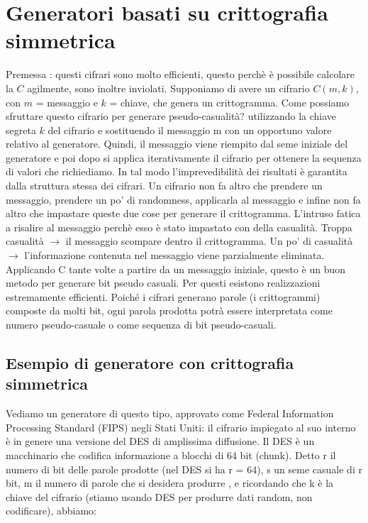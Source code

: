 \newpage

\section{Generatori basati su crittografia simmetrica}

Premessa : questi cifrari sono molto efficienti, questo perchè è possibile calcolare la $C$ agilmente, sono inoltre inviolati. Supponiamo di avere un cifrario $C(m, k)$, con $m$ = messaggio e $k$ = chiave, che genera un crittogramma. Come possiamo sfruttare questo cifrario per generare pseudo-casualità? utilizzando la chiave segreta $k$ del cifrario e sostituendo il messaggio m con un opportuno valore relativo al generatore. Quindi, il messaggio viene riempito dal seme iniziale del generatore e poi dopo si applica iterativamente il cifrario per ottenere la sequenza di valori che richiediamo. In tal modo l’imprevedibilità dei risultati è garantita dalla struttura stessa dei cifrari. Un cifrario non fa altro che prendere un messaggio, prendere un po' di randomness, applicarla al messaggio e infine non fa altro che impastare queste due cose per generare il crittogramma. L'intruso fatica a risalire al messaggio perchè esso è stato impastato con della casualità. Troppa casualità $\rightarrow$ il messaggio scompare dentro il crittogramma. Un po' di casualità $\rightarrow$ l'informazione contenuta nel messaggio viene parzialmente eliminata. Applicando C tante volte a partire da un messaggio iniziale, questo è un buon metodo per generare bit pseudo casuali. Per questi esistono realizzazioni estremamente efficienti. Poiché i cifrari generano parole (i crittogrammi) composte da molti bit, ogni parola prodotta potrà essere interpretata come numero pseudo-casuale o come sequenza di bit pseudo-casuali.

\subsection{Esempio di generatore con crittografia simmetrica}

Vediamo un generatore di questo tipo, approvato come Federal Information Processing Standard (FIPS) negli Stati Uniti: il cifrario impiegato al suo interno è in genere
una versione del DES di amplissima diffusione. Il DES è un macchinario che codifica informazione a blocchi di 64 bit (chunk). Detto r il numero di bit delle parole prodotte (nel DES si ha r = 64), s un seme casuale di r bit, m il numero di parole
che si desidera produrre , e ricordando che k è la chiave del cifrario (stiamo usando DES per produrre dati random, non codificare), abbiamo:

